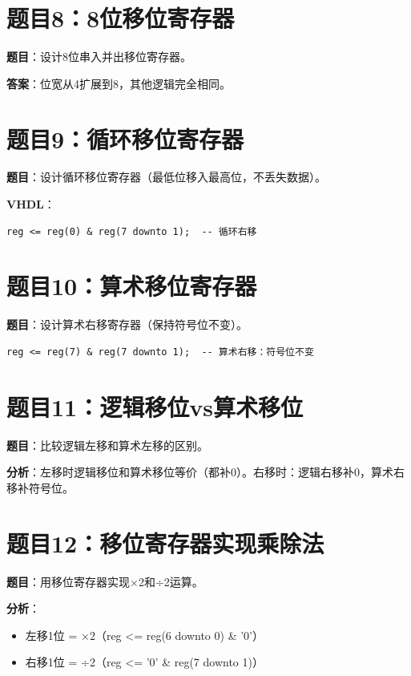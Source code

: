 \section*{题目8：8位移位寄存器}

\textbf{题目}：设计8位串入并出移位寄存器。

\textbf{答案}：位宽从4扩展到8，其他逻辑完全相同。

\section*{题目9：循环移位寄存器}

\textbf{题目}：设计循环移位寄存器（最低位移入最高位，不丢失数据）。

\textbf{VHDL}：
\begin{lstlisting}
reg <= reg(0) & reg(7 downto 1);  -- 循环右移
\end{lstlisting}

\section*{题目10：算术移位寄存器}

\textbf{题目}：设计算术右移寄存器（保持符号位不变）。

\begin{lstlisting}
reg <= reg(7) & reg(7 downto 1);  -- 算术右移：符号位不变
\end{lstlisting}

\section*{题目11：逻辑移位vs算术移位}

\textbf{题目}：比较逻辑左移和算术左移的区别。

\textbf{分析}：左移时逻辑移位和算术移位等价（都补0）。右移时：逻辑右移补0，算术右移补符号位。

\section*{题目12：移位寄存器实现乘除法}

\textbf{题目}：用移位寄存器实现×2和÷2运算。

\textbf{分析}：
\begin{itemize}
  \item 左移1位 = ×2（reg <= reg(6 downto 0) \& '0'）
  \item 右移1位 = ÷2（reg <= '0' \& reg(7 downto 1)）
\end{itemize}

